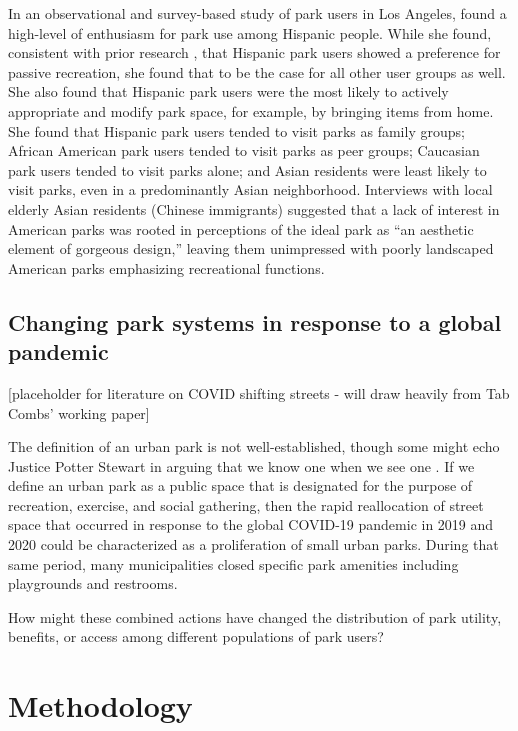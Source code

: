 \documentclass[3p, authoryear]{elsarticle} %
\begin{document}
In an observational and survey-based study of park users in Los Angeles,
\citet{loukaitou1995urban} found a high-level of enthusiasm for park use among Hispanic
people. While she found, consistent with prior research \citep{baas1993influence, hutchison1987ethnicity, irwin1990mexican}, that Hispanic park users showed a
preference for passive recreation, she found that to be the case for all other
user groups as well. She also found that Hispanic park users were the most
likely to actively appropriate and modify park space, for example, by bringing
items from home. She found that Hispanic park users tended to visit parks as
family groups; African American park users tended to visit parks as peer groups;
Caucasian park users tended to visit parks alone; and Asian residents were least
likely to visit parks, even in a predominantly Asian neighborhood. Interviews
with local elderly Asian residents (Chinese immigrants) suggested that a lack of
interest in American parks was rooted in perceptions of the ideal park as ``an
aesthetic element of gorgeous design,'' leaving them unimpressed with poorly
landscaped American parks emphasizing recreational functions.

\hypertarget{changing-park-systems-in-response-to-a-global-pandemic}{%
\subsection{Changing park systems in response to a global pandemic}\label{changing-park-systems-in-response-to-a-global-pandemic}}

{[}placeholder for literature on COVID shifting streets - will draw heavily from
Tab Combs' working paper{]}

The definition of an urban park is not well-established, though some might echo
Justice Potter Stewart in arguing that we know one when we see one
\citep{1964jacobellis}. If we define an urban park as a public space that is
designated for the purpose of recreation, exercise, and social gathering, then
the rapid reallocation of street space that occurred in response to the global
COVID-19 pandemic in 2019 and 2020 could be characterized as a proliferation of
small urban parks. During that same period, many municipalities closed specific
park amenities including playgrounds and restrooms.

How might these combined actions have changed the distribution of park utility,
benefits, or access among different populations of park users?

\hypertarget{methodology}{%
\section{Methodology}\label{methodology}}
\end{document}
